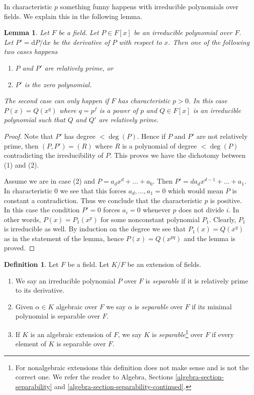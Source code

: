 \documentclass{stacks-project}
\theoremstyle{plain}
\newtheorem{lemma}[subsection]{Lemma}
\theoremstyle{definition}
\newtheorem{definition}[subsection]{Definition}
\theoremstyle{remark}
\numberwithin{equation}{subsection}
\begin{document}
\noindent
In characteristic $p$ something funny happens with irreducible polynomials
over fields. We explain this in the following lemma.

\begin{lemma}
\label{lemma-irreducible-polynomials}
Let $F$ be a field. Let $P \in F[x]$ be an irreducible polynomial over $F$.
Let $P' = \text{d}P/\text{d}x$ be the derivative of $P$ with respect
to $x$. Then one of the following two cases happens
\begin{enumerate}
\item $P$ and $P'$ are relatively prime, or
\item $P'$ is the zero polynomial.
\end{enumerate}
The second case can only happen if $F$ has characteristic $p > 0$.
In this case $P(x) = Q(x^q)$ where $q = p^f$ is a power of $p$ and
$Q \in F[x]$ is an irreducible polynomial such that $Q$ and $Q'$
are relatively prime.
\end{lemma}

\begin{proof}
Note that $P'$ has degree $< \deg(P)$. Hence if $P$ and $P'$ are not relatively
prime, then $(P, P') = (R)$ where $R$ is a polynomial of degree $< \deg(P)$
contradicting the irreducibility of $P$. This proves we have the dichotomy
between (1) and (2).

\medskip\noindent
Assume we are in case (2) and $P = a_d x^d + \ldots + a_0$. Then
$P' = da_d x^{d - 1} + \ldots + a_1$. In characteristic $0$ we see
that this forces $a_d, \ldots, a_1 = 0$ which would mean $P$ is constant
a contradiction. Thus we conclude that the characteristic $p$ is positive.
In this case the condition $P' = 0$ forces $a_i = 0$ whenever $p$ does
not divide $i$.
In other words, $P(x) = P_1(x^p)$ for some nonconstant polynomial $P_1$.
Clearly, $P_1$ is irreducible as well. By induction on the degree we
see that $P_1(x) = Q(x^q)$ as in the statement of the lemma, hence
$P(x) = Q(x^{pq})$ and the lemma is proved.
\end{proof}

\begin{definition}
\label{definition-separable}
Let $F$ be a field. Let $K/F$ be an extension of fields.
\begin{enumerate}
\item We say an irreducible polynomial $P$ over $F$ is {\it separable}
if it is relatively prime to its derivative.
\item Given $\alpha \in K$ algebraic over $F$ we say $\alpha$ is
{\it separable} over $F$ if its minimal polynomial is separable over $F$.
\item If $K$ is an algebraic extension of $F$, we say $K$ is
{\it separable}\footnote{For nonalgebraic extensions
this definition does not make sense and is not the correct one. We refer
the reader to Algebra, Sections \ref{algebra-section-separability} and
\ref{algebra-section-separability-continued}.}
over $F$ if every element of $K$ is separable over $F$.
\end{enumerate}
\end{definition}
\end{document}
